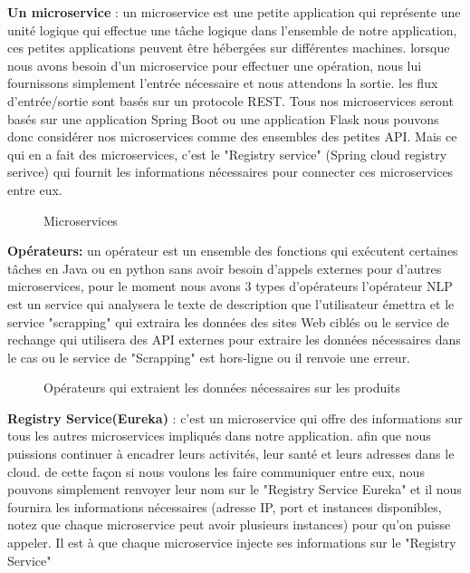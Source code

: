\textbf{Un microservice} : un microservice est une petite application qui représente une unité logique qui effectue une tâche logique dans l'ensemble de notre application, ces petites applications peuvent être hébergées sur différentes machines. lorsque nous avons besoin d'un microservice pour effectuer une opération, nous lui fournissons simplement l'entrée nécessaire et nous attendons la sortie. les flux d'entrée/sortie sont basés sur un protocole REST. Tous nos microservices seront basés sur une application Spring Boot ou une application Flask nous pouvons donc considérer nos microservices comme des ensembles des petites API. Mais ce qui en a fait des microservices, c'est le "Registry service" (Spring cloud registry serivce) qui fournit les informations nécessaires pour connecter ces microservices entre eux.

\begin{figure}[h]
\centering
    \centering
    \qquad
    \caption{Microservices}%
    \label{fig:example}%
\end{figure}



\textbf{ Opérateurs: }un opérateur est un ensemble des fonctions qui exécutent certaines tâches en Java ou en python sans avoir besoin d'appels externes pour d'autres microservices, pour le moment nous avons 3 types d'opérateurs l'opérateur NLP est un service qui analysera le texte de description que l'utilisateur émettra et le service "scrapping" qui extraira les données des sites Web ciblés ou le service de rechange qui utilisera des API externes pour extraire les données nécessaires dans le cas ou le service de "Scrapping" est hors-ligne ou il renvoie une erreur.



\begin{figure}[h]
\centering
    \centering
    \qquad
    \caption{Opérateurs qui extraient les données nécessaires sur les produits }%
    \label{fig:example}%
\end{figure}

\textbf{Registry Service(Eureka)} : c'est un microservice qui offre des informations sur tous les autres microservices impliqués dans notre application. afin que nous puissions continuer à encadrer leurs activités, leur santé et leurs adresses dans le cloud. de cette façon si nous voulons les faire communiquer entre eux, nous pouvons simplement renvoyer leur nom sur le "Registry Service Eureka" et il nous fournira les informations nécessaires (adresse IP, port et instances disponibles, notez que chaque microservice peut avoir plusieurs instances) pour qu'on puisse appeler. Il est à que chaque microservice injecte ses informations sur le "Registry Service"


